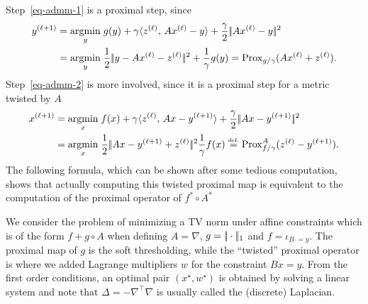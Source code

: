 Step~\eqref{eq-admm-1} is a proximal step, since
\begin{align*}
	y^{(\ell+1)} &= \underset{y}{\operatorname{argmin}}\; 
	g(y) + \gamma \langle z^{(\ell)},\,Ax^{(\ell)}-y\rangle + \frac{\gamma}{2}|\!| Ax^{(\ell)}-y |\!|^2
	\\
	&=\underset{y}{\operatorname{argmin}}\; \frac{1}{2}|\!| y - Ax^{(\ell)} - z^{(\ell)} |\!|^2 + \frac{1}{\gamma} g(y)
	= \operatorname{Prox}_{g/\gamma}( Ax^{(\ell)} + z^{(\ell)} ).
\end{align*}
Step~\eqref{eq-admm-2} is more involved, since it is a proximal step for a metric twisted by $A$
\begin{align*}
	x^{(\ell+1)} &= \underset{x}{\operatorname{argmin}}\; 
	f(x) + \gamma \langle z^{(\ell)},\,Ax-y^{(\ell+1)}\rangle + \frac{\gamma}{2}|\!| Ax-y^{(\ell+1)} |\!|^2
	\\
	&= \underset{x}{\operatorname{argmin}}\; 
	\frac{1}{2}|\!| Ax-y^{(\ell+1)} + z^{(\ell)} |\!|^2
	\frac{1}{\gamma}f(x)
	\stackrel{\mbox{\upshape\tiny def.}}{=} \operatorname{Prox}^A_{f/\gamma}( z^{(\ell)} - y^{(\ell+1)} ).
\end{align*}
The following formula, which can be shown after some tedious computation, shows that actually computing this twisted proximal map is equivalent to the computation of the proximal operator of $f^* \circ A^*$

\begin{exmp}
	We consider the problem of minimizing a TV norm under affine constraints
	which is of the form $f + g \circ A$ when defining $A=\nabla$, $g=|\!| \cdot |\!|_1$ and $f=\iota_{B \cdot = y}$. 
	The proximal map of $g$ is the soft thresholding, while the ``twisted'' proximal operator is
	where we added Lagrange multipliers $w$ for the constraint $Bx=y$. From the first order conditions, an optimal pair $(x^\star,w^\star)$ is obtained by solving a linear system
	and note that $\Delta=-\nabla^\top \nabla$ is usually called the (discrete) Laplacian. 
\end{exmp}

